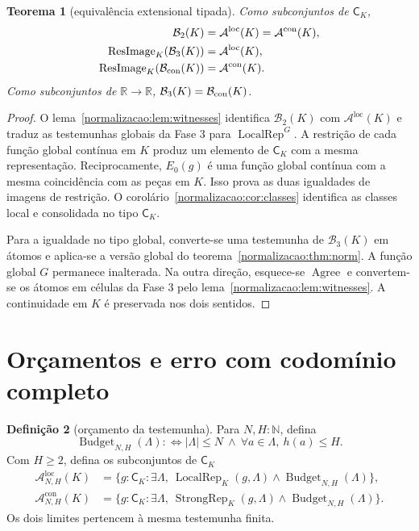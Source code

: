 \documentclass[12pt,a4paper]{article}
\theoremstyle{preciso}
\newtheorem{teorema}{Teorema}[section]
\theoremstyle{definition}
\newtheorem{definicao}[teorema]{Definição}
\newcommand{\N}{\mathbb N}
\newcommand{\R}{\mathbb R}
\newcommand{\CK}{\mathsf C_K}
\newcommand{\Agree}{\operatorname{Agree}}
\newcommand{\Loc}{\operatorname{LocalRep}}
\newcommand{\Str}{\operatorname{StrongRep}}
\newcommand{\ImageRes}{\operatorname{ResImage}}
\newcommand{\Aloc}{\mathcal A^{\mathrm{loc}}}
\newcommand{\Astr}{\mathcal A^{\mathrm{con}}}
\theoremstyle{preciso}
\theoremstyle{preciso}
\theoremstyle{preciso}
\theoremstyle{preciso}
\theoremstyle{definition}
\theoremstyle{preciso}
\theoremstyle{definition}
\theoremstyle{preciso}
\theoremstyle{preciso}
\theoremstyle{definition}
\begin{document}
\begin{teorema}[equivalência extensional tipada]\label{map:normalizacao:5.6}\label{normalizacao:thm:bridge}
Como subconjuntos de $\CK$,
\begin{align*}
 \mathcal B_2(K)&=\Aloc(K)=\Astr(K),\\
 \ImageRes_K(\mathcal B_3(K))&=\Aloc(K),\\
 \ImageRes_K(\mathcal B_{\rm con}(K))&=\Astr(K).
\end{align*}
Como subconjuntos de $\R\to\R$,
$\mathcal B_3(K)=\mathcal B_{\rm con}(K)$.
\end{teorema}
\begin{proof}
O lema~\ref{normalizacao:lem:witnesses} identifica $\mathcal B_2(K)$ com
$\Aloc(K)$ e traduz as testemunhas globais da Fase 3 para
$\Loc^G$. A restrição de cada função global contínua em
$K$ produz um elemento de $\CK$ com a mesma representação.
Reciprocamente, $E_0(g)$ é uma função global contínua com a mesma
coincidência com as peças em $K$. Isso prova as duas igualdades
de imagens de restrição. O corolário~\ref{normalizacao:cor:classes} identifica
as classes local e consolidada no tipo $\CK$.

Para a igualdade no tipo global, converte-se uma testemunha de
$\mathcal B_3(K)$ em átomos e aplica-se a versão global do
teorema~\ref{normalizacao:thm:norm}. A função global $G$ permanece inalterada. Na outra
direção, esquece-se $\Agree$ e convertem-se os átomos em células da
Fase 3 pelo lema~\ref{normalizacao:lem:witnesses}. A continuidade em $K$ é
preservada nos dois sentidos.
\end{proof}

\section{Orçamentos e erro com codomínio completo}
\label{normalizacao:sec:error}

\begin{definicao}[orçamento da testemunha]\label{map:normalizacao:6.1}
Para $N,H:\N$, defina
\[
 \operatorname{Budget}_{N,H}(\Lambda):\Longleftrightarrow
 |\Lambda|\le N\ \land\ \forall a\in\Lambda,\ h(a)\le H.
\]
Com $H\ge2$, defina os subconjuntos de $\CK$
\begin{align*}
 \Aloc_{N,H}(K)&=\{g:\CK:\exists\Lambda,\
       \Loc_K(g,\Lambda)\land\operatorname{Budget}_{N,H}(\Lambda)\},\\
 \Astr_{N,H}(K)&=\{g:\CK:\exists\Lambda,\
       \Str_K(g,\Lambda)\land\operatorname{Budget}_{N,H}(\Lambda)\}.
\end{align*}
Os dois limites pertencem à mesma testemunha finita.
\end{definicao}
\end{document}

